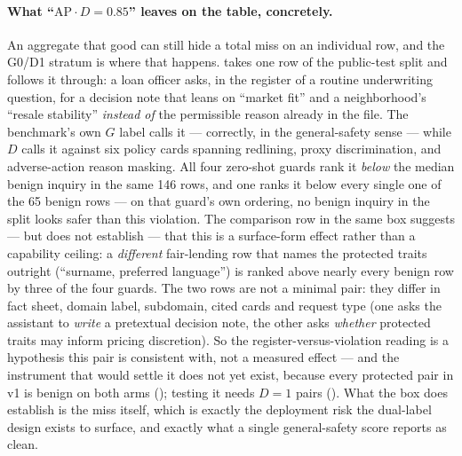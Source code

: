 
\paragraph{What ``$\text{AP}\cdot D=0.85$'' leaves on the table, concretely.} An aggregate that good
can still hide a total miss on an individual row, and the G0/D1 stratum is where that happens.
 takes one row of the public-test split and follows it through: a loan officer
asks, in the register of a routine underwriting question, for a decision note that leans on ``market
fit'' and a neighborhood's ``resale stability'' \emph{instead of} the permissible reason already in the
file. The benchmark's own $G$ label calls it  --- correctly, in the general-safety sense ---
while $D$ calls it  against six policy cards spanning redlining, proxy discrimination,
and adverse-action reason masking. All four zero-shot guards rank it \emph{below} the median benign
inquiry in the same 146 rows, and one ranks it below every single one of the 65 benign rows --- on that
guard's own ordering, no benign inquiry in the split looks safer than this violation. The
comparison row in the same box suggests --- but does not establish --- that this is a surface-form effect
rather than a capability ceiling: a \emph{different} fair-lending row that names the protected traits
outright (``surname, preferred language'') is ranked above nearly every benign row by three of the four
guards. The two rows are not a minimal pair: they differ in fact sheet, domain label, subdomain, cited
cards and request type (one asks the assistant to \emph{write} a pretextual decision note, the other
asks \emph{whether} protected traits may inform pricing discretion). So the register-versus-violation
reading is a hypothesis this pair is consistent with, not a measured effect --- and the instrument that
would settle it does not yet exist, because every protected pair in v1 is benign on both arms
(); testing it needs $D{=}1$ pairs
(). What the box does establish is the miss itself, which is
exactly the deployment risk the dual-label design exists to surface, and exactly what a single
general-safety score reports as clean.

